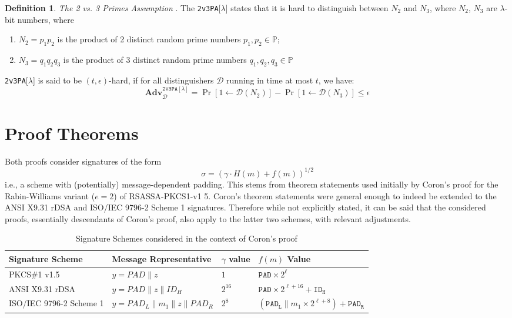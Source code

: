 \documentclass[]{final_report}
\theoremstyle{definition}
\newtheorem{definition}{Definition}[chapter]
\begin{document}
\begin{definition}
\textit{The 2 vs. 3 Primes Assumption} \cite{jager2018security} . The \texttt{2v3PA}[$\lambda$] states that it is hard to distinguish between $N_2$ and $N_3$, where $N_2$, $N_3$ are $\lambda$-bit numbers, where 
\begin{enumerate}
\item $N_2 = p_1 p_2$ is the product of 2 distinct random prime numbers $p_1, p_2 \in \mathbb{P}$; 
\item $N_3 = q_1 q_2 q_3$ is the product of 3 distinct random prime numbers $q_1, q_2, q_3 \in \mathbb{P}$
\end{enumerate}
\texttt{2v3PA}[$\lambda$] is said to be $(t, \epsilon)$-hard, if for all distinguishers $\mathcal{D}$ running in time at most $t$, we have:
\[
\textbf{Adv}^{\texttt{2v3PA}[\lambda]}_\mathcal{D} = \Pr[1 \leftarrow \mathcal{D}(N_2)] - \Pr[1 \leftarrow \mathcal{D}(N_3)] \leqslant \epsilon
\]
\end{definition}

\section{Proof Theorems}
Both proofs consider signatures of the form \[ \sigma = (\gamma \cdot H(m) + f(m))^{1/2} \] i.e., a scheme with (potentially) message-dependent padding. This stems from theorem statements used initially by Coron's proof \cite{coron2002security} for the Rabin-Williams variant (\( e = 2 \)) of RSASSA-PKCS1-v1 5. Coron's theorem statements were general enough to indeed be extended to the ANSI X9.31 rDSA and ISO/IEC 9796-2 Scheme 1 signatures. Therefore while not explicitly stated, it can be said that the considered proofs, essentially descendants of Coron's proof, also apply to the latter two schemes, with relevant adjustments.
\begin{table}[H]

\begin{tabular}{|m{4.38cm}|m{5cm}|m{1.5cm}|m{4cm}|}
\hline
\textbf{Signature Scheme} & \textbf{Message Representative} & \textbf{$\gamma$ value} & \textbf{\( f(m) \) Value} \\ \hline
PKCS\#1 v1.5              & \( y = PAD  \| z \)      & \(1\) & \( \texttt{PAD} \times 2^{\ell} \) \\ \hline
ANSI X9.31 rDSA           & \( y = PAD  \| z \| ID_{H} \)          & \( 2^{16} \)     & \( \texttt{PAD} \times 2^{\ell + 16} + \texttt{ID}_{\texttt{H}} \)     \\ \hline
ISO/IEC 9796-2 Scheme 1   & \( y = PAD_{L} \| m_{1} \| z \| PAD_{R} \)            & \( 2^{8} \)       & \( (\texttt{PAD}_{\texttt{L}} \| m_{1} \times 2^{\ell + 8}) + \texttt{PAD}_{\texttt{R}} \)       \\ \hline
\end{tabular}
\caption{Signature Schemes considered in the context of Coron's proof \cite{coron2002security}}
\label{table:coron}
\end{table}
\end{document}
